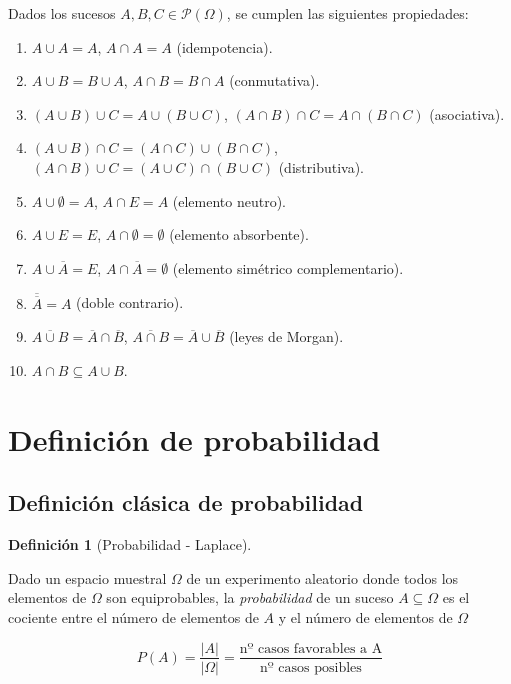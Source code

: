 \documentclass[
  a4paper,
]{scrreport}
\providecommand{\tightlist}{%
  \setlength{\itemsep}{0pt}\setlength{\parskip}{0pt}}\usepackage{longtable,booktabs,array}
\theoremstyle{plain}
\theoremstyle{definition}
\newtheorem{definition}{Definición}[chapter]
\theoremstyle{definition}
\theoremstyle{remark}
\begin{document}
Dados los sucesos \(A,B,C\in  \mathcal{P}(\Omega)\), se cumplen las
siguientes propiedades:

\begin{enumerate}
\def\labelenumi{\arabic{enumi}.}
\tightlist
\item
  \(A\cup A=A\), \(A\cap A=A\) (idempotencia).
\item
  \(A\cup B=B\cup A\), \(A\cap B = B\cap A\) (conmutativa).
\item
  \((A\cup B)\cup C = A\cup (B\cup C)\),
  \((A\cap B)\cap C = A\cap (B\cap C)\) (asociativa).
\item
  \((A\cup B)\cap C = (A\cap C)\cup (B\cap C)\),
  \((A\cap B)\cup C = (A\cup C)\cap (B\cup C)\) (distributiva).
\item
  \(A\cup \emptyset=A\), \(A\cap E=A\) (elemento neutro).
\item
  \(A\cup E=E\), \(A\cap \emptyset=\emptyset\) (elemento absorbente).
\item
  \(A\cup \overline A = E\), \(A\cap \overline A= \emptyset\) (elemento
  simétrico complementario).
\item
  \(\overline{\overline A} = A\) (doble contrario).
\item
  \(\overline{A\cup B} = \overline A\cap \overline B\),
  \(\overline{A\cap B} = \overline A\cup \overline B\) (leyes de
  Morgan).
\item
  \(A\cap B\subseteq A\cup B\).
\end{enumerate}

\section{Definición de
probabilidad}\label{definiciuxf3n-de-probabilidad}

\subsection{Definición clásica de
probabilidad}\label{definiciuxf3n-cluxe1sica-de-probabilidad}

\begin{definition}[Probabilidad -
Laplace]\protect\hypertarget{def-laplace}{}\label{def-laplace}

Dado un espacio muestral \(\Omega\) de un experimento aleatorio donde
todos los elementos de \(\Omega\) son equiprobables, la
\emph{probabilidad} de un suceso \(A\subseteq \Omega\) es el cociente
entre el número de elementos de \(A\) y el número de elementos de
\(\Omega\)

\[P(A) = \frac{|A|}{|\Omega|} = \frac{\mbox{nº casos favorables a A}}{\mbox{nº casos posibles}}\]

\end{definition}
\end{document}
